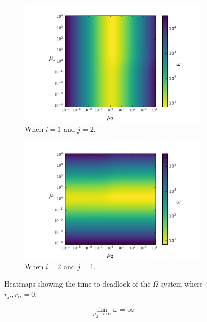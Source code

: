 \documentclass{article}
\begin{document}
\begin{figure}[htbp!]
	\begin{center}
	  \begin{subfigure}{0.45\textwidth}
		\includegraphics[width=\textwidth]{images/r12r22.pdf}
		\caption{When $i = 1$ and $j = 2$.}
	  \end{subfigure}
	  \begin{subfigure}{0.45\textwidth}
		\includegraphics[width=\textwidth]{images/r11r21.pdf}
		\caption{When $i = 2$ and $j = 1$.}
	  \end{subfigure}
	\end{center}
	\caption{Heatmaps showing the time to deadlock of the $\Omega$ system where $r_{ji}, r_{ii} = 0$.}
	\label{fig:rijrjj}
\end{figure}

\begin{equation}\label{eqn:r12r22_inf}
\lim_{\mu_2 \to \infty} \omega = \infty
\end{equation}
\end{document}
